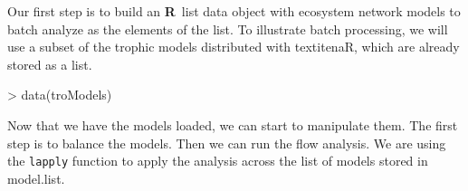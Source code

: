 \documentclass[article]{jss}
\newcommand{\R}{\textbf{R}}
\begin{document}
Our first step is to build an \R\ list data object with ecosystem
network models to batch analyze as the elements of the list.  To
illustrate batch processing, we will use a subset of the trophic models
distributed with textit{enaR}, which are already stored as a list.

\begin{Schunk}
\begin{Sinput}
> data(troModels)
\end{Sinput}
\end{Schunk}

Now that we have the models loaded, we can start to manipulate
them.  The first step is to balance the models.  Then we can run the
flow analysis.  We are using the \texttt{lapply} function to apply the
analysis across the list of models stored in model.list.

\end{document}
